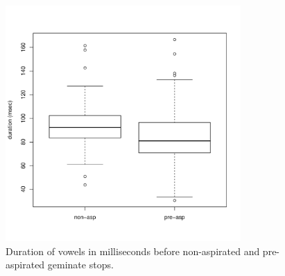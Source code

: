 \documentclass[11pt,a4paper,openany]{memoir}\usepackage[]{graphicx}\usepackage[]{color}
\newenvironment{knitrout}{}{} %
\begin{document}
\begin{figure}
\centering
\begin{knitrout}
\color{fgcolor}
\includegraphics[width=0.8\textwidth]{img/vow-stop-1} 

\end{knitrout}
\caption{Duration of vowels in milliseconds before non-aspirated and pre-aspirated geminate stops.
}
\label{f:absvow}
\end{figure}
\end{document}
